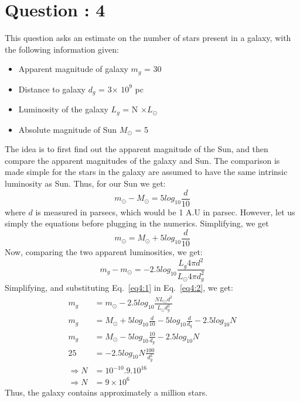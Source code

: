 \documentclass{article}
\begin{document}
\section{Question : 4}
{
This question asks an estimate on the number of stars present in a galaxy, with the following information given:
\begin{itemize}
\item Apparent magnitude of galaxy $m_{g}$ = 30
\item Distance to galaxy $d_{g}$ = 3$\times$ $10^9$ pc
\item Luminosity of the galaxy $L_{g}$ = N $\times L_\odot$
\item Absolute magnitude of Sun $M_\odot$ = 5
\end{itemize}
The idea is to first find out the apparent magnitude of the Sun, and then compare the apparent magnitudes of the galaxy and Sun. The comparison is made simple for the stars in the galaxy are assumed to have the same intrinsic luminosity as Sun. Thus, for our Sun we get:
\begin{equation}
m_\odot - M_\odot = 5 log_{10} \frac{d}{10} 
\end{equation}
where $d$ is measured in parsecs, which would be 1 A.U in parsec. However, let us simply the equations before plugging in the numerics. Simplifying, we get 
\begin{equation}
m_\odot = M_\odot + 5 log_{10} \frac{d}{10} 
\label{eq4:1}
\end{equation}
Now, comparing the two apparent luminosities, we get:
\begin{equation}
m_g - m_\odot = -2.5 log_{10} \frac{L_{g} 4 \pi d^2}{L_\odot 4\pi d_g^2}
\label{eq4:2}
\end{equation}
Simplifying, and substituting Eq.~\ref{eq4:1} in Eq.~\ref{eq4:2}, we get:
\begin{equation}
\begin{split}
m_g &= m_\odot - 2.5 log_{10}\frac{NL_\odot d^2}{L_\odot d_g^2} \\
m_g &= M_\odot + 5log_{10}\frac{d}{10} - 5log_{10}\frac{d}{d_g} - 2.5log_{10} N \\
m_g & = M_\odot -5log_{10}\frac{10}{d_g}-2.5log_{10} N \\
25 &= -2.5log_{10} N\frac{100}{d_g^2} \\
\Rightarrow N &=10^{-10}.9.10^{16} \\
\Rightarrow N &=9\times10^6
\end{split}
\end{equation}
Thus, the galaxy contains approximately a million stars. 
}
\end{document}
